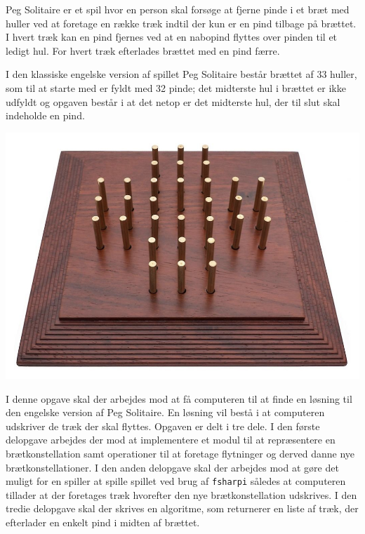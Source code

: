 Peg Solitaire er et spil hvor en person skal forsøge at fjerne pinde i
et bræt med huller ved at foretage en række træk indtil der kun er en
pind tilbage på brættet. I hvert træk kan en pind fjernes ved at en
nabopind flyttes over pinden til et ledigt hul. For hvert træk
efterlades brættet med en pind færre.

\begin{minipage}{.8\linewidth}
I den klassiske engelske version af spillet Peg Solitaire består
brættet af 33 huller, som til at starte med er fyldt med 32 pinde; det
midterste hul i brættet er ikke udfyldt og opgaven består i at det
netop er det midterste hul, der til slut skal indeholde en pind.
\end{minipage}
\begin{minipage}{.2\linewidth}
  \includegraphics[width=\linewidth]{solitaire.png}
\end{minipage}

I denne opgave skal der arbejdes mod at få computeren til at finde en
løsning til den engelske version af Peg Solitaire. En løsning vil
bestå i at computeren udskriver de træk der skal flyttes. Opgaven er
delt i tre dele. I den første delopgave arbejdes der mod at
implementere et modul til at repræsentere en brætkonstellation samt
operationer til at foretage flytninger og derved danne nye
brætkonstellationer. I den anden delopgave skal der arbejdes mod at
gøre det muligt for en spiller at spille spillet ved brug
af \texttt{fsharpi} således at computeren tillader at der foretages træk
hvorefter den nye brætkonstellation udskrives. I den tredie delopgave skal
der skrives en algoritme, som returnerer en liste af træk, der
efterlader en enkelt pind i midten af brættet.
